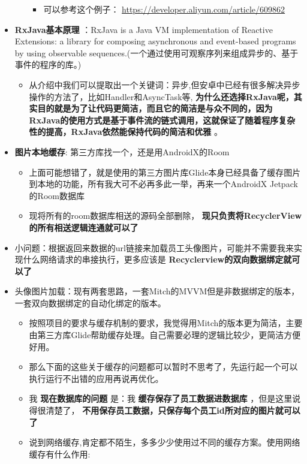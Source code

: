 \documentclass[9pt, b5paper]{article}
\begin{document}
\begin{itemize}
\begin{itemize}
\begin{itemize}
\item 可以参考这个例子： \url{https://developer.aliyun.com/article/609862}
\end{itemize}
\end{itemize}
\item \textbf{RxJava基本原理} ：RxJava is a Java VM implementation of Reactive Extensions: a library for composing asynchronous and event-based programs by using observable sequences.(一个通过使用可观察序列来组成异步的、基于事件的程序的库。)
\begin{itemize}
\item 从介绍中我们可以提取出一个关键词：异步,但安卓中已经有很多解决异步操作的方法了，比如Handler和AsyncTask等, \textbf{为什么还选择RxJava呢，其实目的就是为了让代码更简洁，而且它的简洁是与众不同的，因为RxJava的使用方式是基于事件流的链式调用，这就保证了随着程序复杂性的提高，RxJava依然能保持代码的简洁和优雅} 。
\end{itemize}
\item \textbf{图片本地缓存}: 第三方库找一个，还是用AndroidX的Room
\begin{itemize}
\item 上面可能想错了，就是使用的第三方图片库Glide本身已经具备了缓存图片到本地的功能，所有我大可不必再多此一举，再来一个AndroidX Jetpack的Room数据库
\item 现将所有的room数据库相送的源码全部删除， \textbf{现只负责将RecyclerView的所有相送逻辑连通就可以了}
\end{itemize}
\item 小问题：根据返回来数据的url链接来加载员工头像图片，可能并不需要我来实现什么网络请求的串接执行，更多应该是 \textbf{Recyclerview的双向数据绑定就可以了}
\item 头像图片加载：现有两套思路，一套Mitch的MVVM但是非数据绑定的版本，一套双向数据绑定的自动化绑定的版本。
\begin{itemize}
\item 按照项目的要求与缓存机制的要求，我觉得用Mitch的版本更为简洁，主要由第三方库Glide帮助缓存处理。自己需要必理的逻辑比较少，更简洁方便好用。
\item 那么下面的这些关于缓存的问题都可以暂时不思考了，先运行起一个可以执行运行不出错的应用再说再优化。
\item 我 \textbf{现在数据库的问题} 是：我 \textbf{缓存保存了员工数据进数据库} ，但是这里说得很清楚了， \textbf{不用保存员工数据，只保存每个员工id所对应的图片就可以了}
\item 说到网络缓存,肯定都不陌生，多多少少使用过不同的缓存方案。使用网络缓存有什么作用:
\begin{itemize}

\end{itemize}
\end{itemize}
\end{itemize}
\end{document}
